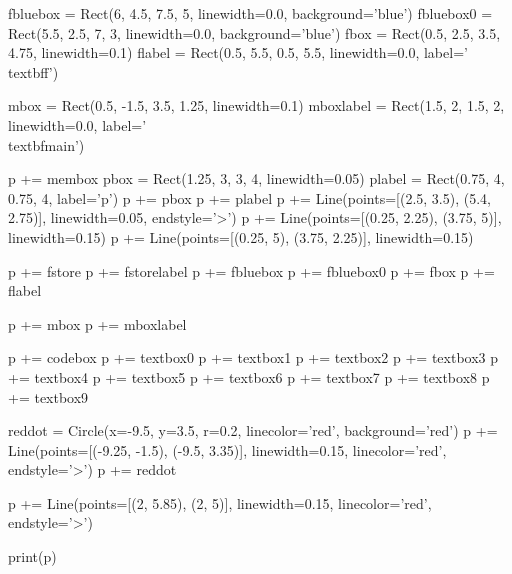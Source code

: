 \begin{python}
fbluebox = Rect(6, 4.5, 7.5, 5, linewidth=0.0, background='blue')
fbluebox0 = Rect(5.5, 2.5, 7, 3, linewidth=0.0, background='blue')
fbox = Rect(0.5, 2.5, 3.5, 4.75, linewidth=0.1)
flabel = Rect(0.5, 5.5, 0.5, 5.5, linewidth=0.0, label='\\textbf{f}')

mbox = Rect(0.5, -1.5, 3.5, 1.25, linewidth=0.1)
mboxlabel = Rect(1.5, 2, 1.5, 2, linewidth=0.0, label='\\textbf{main}')

p += membox
pbox = Rect(1.25, 3, 3, 4, linewidth=0.05)
plabel = Rect(0.75, 4, 0.75, 4, label='p')
p += pbox
p += plabel
p += Line(points=[(2.5, 3.5), (5.4, 2.75)], linewidth=0.05, endstyle='>')
p += Line(points=[(0.25, 2.25), (3.75, 5)], linewidth=0.15)
p += Line(points=[(0.25, 5), (3.75, 2.25)], linewidth=0.15)

p += fstore
p += fstorelabel
p += fbluebox
p += fbluebox0
p += fbox
p += flabel

p += mbox
p += mboxlabel

p += codebox
p += textbox0
p += textbox1
p += textbox2
p += textbox3
p += textbox4
p += textbox5
p += textbox6
p += textbox7
p += textbox8
p += textbox9

reddot = Circle(x=-9.5, y=3.5, r=0.2, linecolor='red', background='red')
p += Line(points=[(-9.25, -1.5), (-9.5, 3.35)], linewidth=0.15, linecolor='red', endstyle='>')
p += reddot

p += Line(points=[(2, 5.85), (2, 5)], linewidth=0.15, linecolor='red', endstyle='>')

print(p)
\end{python}

